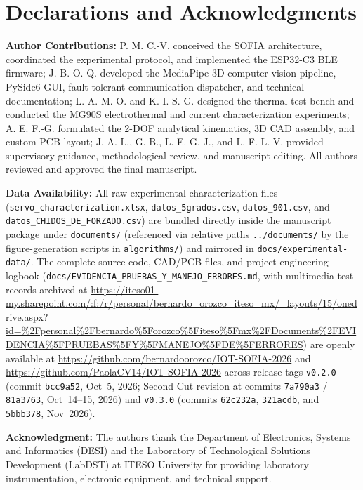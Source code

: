 \documentclass[lettersize,journal]{IEEEtran}
\begin{document}
	\section*{Declarations and Acknowledgments}
	\footnotesize
	
	\noindent\textbf{Author Contributions:} 
	P. M. C.-V. conceived the SOFIA architecture, coordinated the experimental
	protocol, and implemented the ESP32-C3 BLE firmware;
	J. B. O.-Q. developed the MediaPipe 3D computer vision pipeline, PySide6 GUI,
	fault-tolerant communication dispatcher, and technical documentation;
	L. A. M.-O. and K. I. S.-G. designed the thermal test bench and conducted
	the MG90S electrothermal and current characterization experiments;
	A. E. F.-G. formulated the 2-DOF analytical kinematics, 3D CAD assembly, and
	custom PCB layout; J. A. L., G. B., L. E. G.-J., and L. F. L.-V. provided
	supervisory guidance, methodological review, and manuscript editing.
	All authors reviewed and approved the final manuscript.
	
	\noindent\textbf{Data Availability:} 
	All raw experimental characterization files (\texttt{servo\_characterization.xlsx},
	\texttt{datos\_5grados.csv}, \texttt{datos\_901.csv}, and
	\texttt{datos\_CHIDOS\_DE\_FORZADO.csv}) are bundled directly inside the
	manuscript package under \texttt{documents/} (referenced via relative paths
	\texttt{../documents/} by the figure-generation scripts in \texttt{algorithms/})
	and mirrored in \texttt{docs/experimental-data/}. The complete source code,
	CAD/PCB files, and project engineering logbook
	(\texttt{docs/EVIDENCIA\_PRUEBAS\_Y\_MANEJO\_ERRORES.md}, with multimedia test
	records archived at \url{https://iteso01-my.sharepoint.com/:f:/r/personal/bernardo_orozco_iteso_mx/_layouts/15/onedrive.aspx?id=%2Fpersonal%2Fbernardo%5Forozco%5Fiteso%5Fmx%2FDocuments%2FEVIDENCIA%5FPRUEBAS%5FY%5FMANEJO%5FDE%5FERRORES})
	are openly available at \url{https://github.com/bernardoorozco/IOT-SOFIA-2026}
	and \url{https://github.com/PaolaCV14/IOT-SOFIA-2026} across release tags
	\texttt{v0.2.0} (commit \texttt{bcc9a52}, Oct~5, 2026; Second Cut revision at
	commits \texttt{7a790a3} / \texttt{81a3763}, Oct~14--15, 2026) and
	\texttt{v0.3.0} (commits \texttt{62c232a}, \texttt{321acdb}, and \texttt{5bbb378}, Nov~2026).
	
	\noindent\textbf{Acknowledgment:} 
	The authors thank the Department of Electronics, Systems and Informatics
	(DESI) and the Laboratory of Technological Solutions Development (LabDST)
	at ITESO University for providing laboratory instrumentation, electronic
	equipment, and technical support.
	
\end{document}
